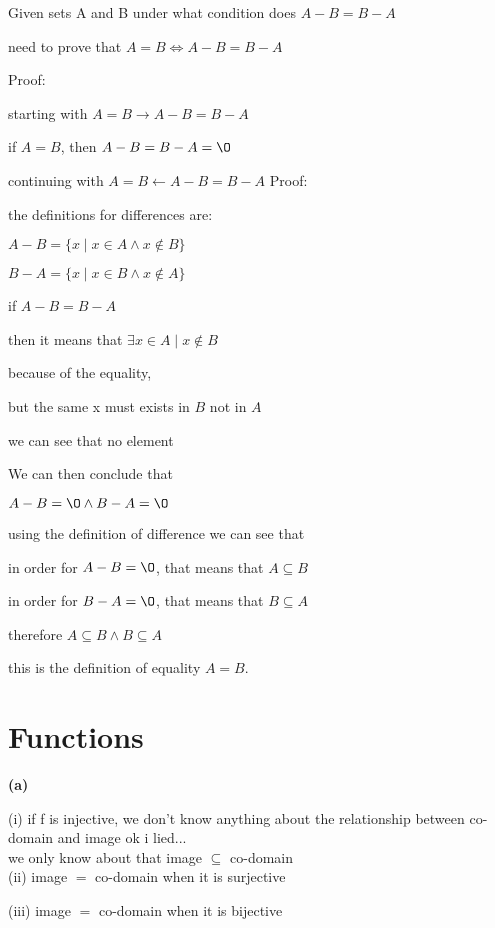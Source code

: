 \documentclass[12pts,A4]{article}
\begin{document}
\begin{flushleft}
    Given sets A and B under what condition does $A-B= B-A$ 

    need to prove that $ A=B \iff A-B = B-A $
    

    \bigskip
    Proof:


    starting with $A=B \rightarrow A-B = B-A $
    
    if $A=B$, then $A-B = B-A = \O$
    
    
    \bigskip

    continuing with $A=B \leftarrow A-B = B-A$
    \bigskip
    Proof:
        
        the definitions for differences are:

        \smallskip
        $ A-B = \{x \mid x \in A \wedge x \not\in B\}$

        \smallskip

        $ B-A = \{x \mid x \in B \wedge x \not\in A\}$

        if $A-B = B-A$

        then it means that $\exists x \in A \mid x \not\in B$
        
        because of the equality,


        but the same x must exists in $B$ not in $A$

        we can see that no element 
        
        We can then conclude that

        $A - B = \O \wedge  B- A = \O$

        using the definition of difference we can see that

        in order for $A - B = \O$, that means that $A \subseteq B$
        
        in order for $B - A = \O$, that means that $B \subseteq A$
        
        \bigskip 
        therefore $A \subseteq B \wedge B \subseteq A$

        this is the definition of equality $A = B$.




        

\end{flushleft}


\section{Functions}

\begin{flushleft}
    \textbf{(a)}

    (i) if f is injective, we don't know anything about the relationship between co-domain and image
    ok i lied... \\ 
    we only know about that image $\subseteq$ co-domain\\
    
    (ii) image $=$ co-domain when it is surjective

    (iii) image $=$ co-domain when it is bijective 
    
     
\end{flushleft}
\end{document}
